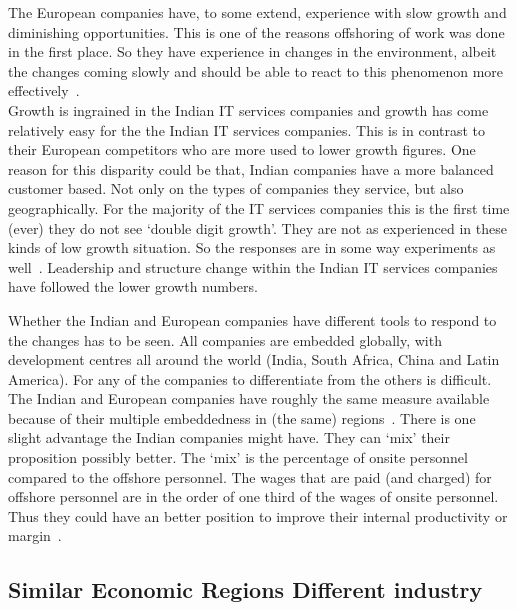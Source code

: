 The European companies have, to some extend, experience with slow growth and diminishing opportunities.
This is one of the reasons offshoring of work was done in the first place.
So they have experience in changes in the environment, albeit the changes coming slowly and should be able to react to this phenomenon more effectively~\citep{Prahalad:2003th}.\\
Growth is ingrained in the Indian IT services companies and growth has come relatively easy for the the Indian IT services companies.
This is in contrast to their European competitors who are more used to lower growth figures.
One reason for this disparity could be that, Indian companies have a more balanced customer based.
Not only on the types of companies they service, but also geographically.
For the majority of the IT services companies this is the first time (ever) they do not see `double digit growth'.
They are not as experienced in these kinds of low growth situation.
So the responses are in some way experiments as well~\citep{Newman:2000fc,Chittoor:2008cj}.
Leadership and structure change within the Indian IT services companies have followed the lower growth numbers.

Whether the Indian and European companies have different tools to respond to the changes has to be seen.
All companies are embedded globally, with development centres all around the world (India, South Africa, China and Latin America).
For any of the companies to differentiate from the others is difficult.
The Indian and European companies have roughly the same measure available because of their  multiple embeddedness in (the same) regions~\citep{Westney:2005vv,Meyer:2011vt}.
There is one slight advantage the Indian companies might have.
They can `mix' their proposition possibly better.
The `mix' is the percentage of onsite personnel compared to the  offshore personnel.
The wages that are paid (and charged) for offshore personnel are in the order of one third of the wages of onsite personnel.
Thus they could have an better position to improve their internal productivity or margin~\citep{Lawton:2009vw}.


\subsection{Similar Economic Regions Different industry}


